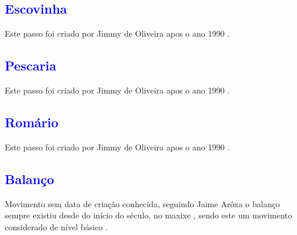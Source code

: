 \subsection{\textcolor{blue}{Escovinha}}
Este passo foi criado por Jimmy de Oliveira apos o ano 1990 \cite{sambafunkeadoJimmyDeOliveiraPart1}.

\subsection{\textcolor{blue}{Pescaria}} 
Este passo foi criado por Jimmy de Oliveira apos o ano 1990 \cite{sambafunkeadoJimmyDeOliveiraPart1}.

\subsection{\textcolor{blue}{Romário}}
\label{subsec:passo:romario}
Este passo foi criado por Jimmy de Oliveira apos o ano 1990 \cite{sambafunkeadoJimmyDeOliveiraPart1}.





\subsection{\textcolor{blue}{Balanço}}
Movimento sem data de criação conhecida, 
seguindo Jaime Arôxa o balanço sempre existiu desde do início do século, 
no maxixe \cite{EntrevistaJaimeAroxa1},
sendo este um movimento considerado de nível básico \cite[pp. 144]{perna2002samba}.



